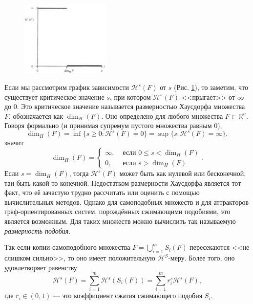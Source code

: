 \documentclass[a4paper,14pt]{extarticle} %
\newcommand{\cH}{\mathcal{H}}
\newcommand{\IN}{\subset}
\newcommand{\rr}{\mathbb{R}}
\newcommand{\0}{\varnothing}
\newcommand{\8}{\infty}
\theoremstyle{definition}
\begin{document}
\begin{figure}[H]
    \centering
    \includegraphics[width=0.4\textwidth]{dimH.png}
    \begin{minipage}{0.85\textwidth}
        \caption{}
        \label{fig:dimH}
    \end{minipage}
\end{figure}
Если мы рассмотрим график зависимости $\cH^s(F)$ от $s$ (Рис. \ref{fig:dimH}), то заметим, что существует критическое значение $s$, при котором $\cH^s(F)$ <<прыгает>> от $\8$ до $0$. 
Это критическое значение называется размерностью Хаусдорфа множества $F$, обозначается как $\dim_H(F)$. 
Оно определено для любого множества $F\IN\rr^n.$
Говоря формально (и принимая супремум пустого множества равным 0),
\begin{equation}
    \dim_H(F)=\inf\{s\geq0 : \cH^s(F)=0\}=\sup\{s :\cH^s(F)=\8\},
\end{equation}
значит 
$$\dim_H(F)=\begin{cases}
\8, & \text{ если } 0\leq s<\dim_H(F)\\
0, & \text{ если } s>\dim_H(F)
\end{cases}.$$
Если $s = \dim_H(F)$, тогда $\cH^s(F)$ может быть как нулевой или бесконечной, таи быть какой-то конечной.
Недостатком размерности Хаусдорфа является тот факт, что её зачастую трудно рассчитать или оценить с помощью вычислительных методов.
Однако для самоподобных множеств и для аттракторов граф-ориентированных систем, порождённых сжимающими подобиями, это является возможным.
Для таких множеств можно вычислить так называемую {\em размерность подобия}.

Так если копии самоподобного множества $F=\bigcup\limits_{i=1}^mS_i(F)$ пересекаются <<не слишком сильно>>, то оно имеет положительную $\cH^S$-меру.
Более того, оно удовлетворяет равенству
\begin{equation}
    \cH^s(F)=\sum_{i=1}^m \cH^s(S_i(F))=\sum_{i=1}^m r_i^s\cH^s(F),
\end{equation}
где $r_i\in(0,1)$ --- это коэффициент сжатия сжимающего подобия $S_i$.
\end{document}
